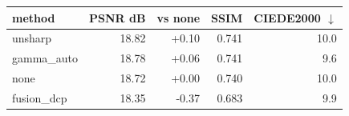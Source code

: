 \begin{tabular}{lrrrr}
\toprule
method & PSNR dB & vs none & SSIM & CIEDE2000 $\downarrow$ \\
\midrule
unsharp & 18.82 & +0.10 & 0.741 & 10.0 \\
gamma\_auto & 18.78 & +0.06 & 0.741 & 9.6 \\
none & 18.72 & +0.00 & 0.740 & 10.0 \\
fusion\_dcp & 18.35 & -0.37 & 0.683 & 9.9 \\
\bottomrule
\end{tabular}
